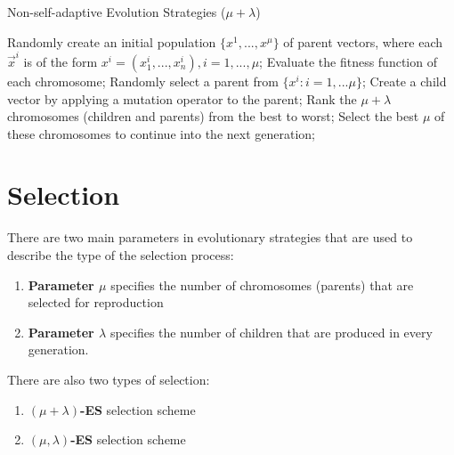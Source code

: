 \begin{algorithm}[H]
\caption{Non-self-adaptive Evolution Strategies ($\mu + \lambda$)}\label{evolution-strategies}
\begin{algorithmic}[1]
    \State Randomly create an initial population $\{x^1,...,x^\mu\}$ of parent vectors, where each $\vec{x}^i$ is of the form $x^i = (x_1^i,...,x_n^i), i = 1,...,\mu$;
    \State Evaluate the fitness function of each chromosome;
        \Repeat
            \State Randomly select a parent from $\{x^i : i = 1,...\mu\}$;
            \State Create a child vector by applying a mutation operator to the parent;
        \State Rank the $\mu + \lambda$ chromosomes (children and parents) from the best to worst;
        \State Select the best $\mu$ of these chromosomes to continue into the next generation;
    \EndWhile
\end{algorithmic}
\end{algorithm}

\section{Selection}
There are two main parameters in evolutionary strategies that are used to describe the type of the selection process:

 \begin{enumerate}
    \item \textbf{Parameter \boldmath$\mu$} specifies the number of chromosomes (parents) that are selected for reproduction
    \item \textbf{Parameter \boldmath$\lambda$} specifies the number of children that are produced in every generation.
 \end{enumerate}

There are also two types of selection:
\begin{center}
\begin{minipage}{.4\textwidth}
    \begin{enumerate}
        \item \boldmath$(\mu + \lambda)$\textbf{-ES} selection scheme
        \item $(\mu,\lambda)$\textbf{-ES} selection scheme
    \end{enumerate}
\end{minipage}
\end{center}

